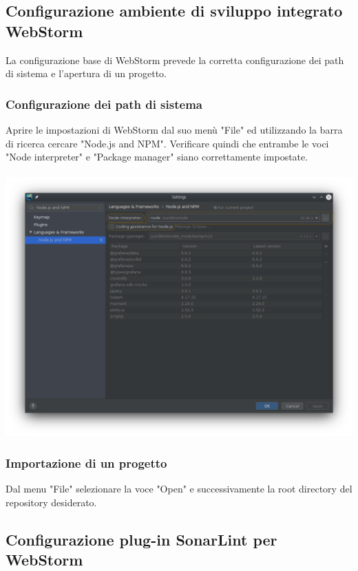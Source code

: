 \subsection{Configurazione ambiente di sviluppo integrato WebStorm}
La configurazione base di WebStorm prevede la corretta configurazione dei path di sistema e l'apertura di un progetto.
\subsubsection{Configurazione dei path di sistema}
Aprire le impostazioni di WebStorm dal suo menù "File" ed utilizzando la barra di ricerca cercare "Node.js and NPM". Verificare quindi che entrambe le voci "Node interpreter" e "Package manager" siano correttamente impostate.
\\
\\
\includegraphics[width=\textwidth,height=\textheight,keepaspectratio]{img/node-npm.png}
\subsubsection{Importazione di un progetto}
Dal menu "File" selezionare la voce "Open" e successivamente la root directory del repository desiderato.

\pagebreak
\subsection{Configurazione plug-in SonarLint per WebStorm}
